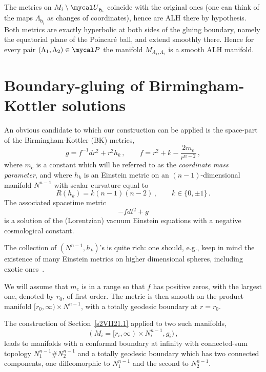 \documentclass[a4paper,10pt]{article}
\newcommand{\horo}{\red{\mathfrak{h}}}
\newcommand{\horoG}{\red{\mycal P}}
\newcommand{\Nk}{\red{N^{n-1}}}
\newcommand{\Nkone}{\red{N^{n-1}_1}}
\newcommand{\Nktwo}{\red{N^{n-1}_2}}
\newcommand{\Nki}{\red{N^{n-1}_i}}
\newcommand{\hk}{\red{h_{k}}}
\newcommand{\red}[1]{{\color{red}#1}}
\newcommand{\mc}{\red{m_{\mathrm c}}}
\newcommand{\mcU}{{\mycal U}}
\renewcommand{\red}[1]{#1}%
\begin{document}
      The metrics on $M_i\setminus \mcU_{\horo_i}$ coincide with the original ones
      (one can think of the maps $\Lambda_{\horo_i}$ as changes of coordinates),
      hence are ALH there by hypothesis. Both metrics are exactly hyperbolic at both
      sides of  the gluing boundary, namely the equatorial plane of the Poincar\'e
      ball, and extend smoothly there. Hence for every pair
      $(\Lambda_1,\Lambda_2)\in \horoG$ the manifold $M_{\Lambda_1,\Lambda_2}$ is a
      smooth ALH manifold.



      \section{Boundary-gluing of Birmingham-Kottler solutions}
      \label{s29VIII21.1}


      An obvious candidate to which our construction can be applied is the space-part of the Birmingham-Kottler (BK) metrics,
      \begin{equation}\label{26XI21.1}
        g = f^{-1} dr^2 + r^2 \hk
        \,,
        \qquad
        f = r^2 + k - \frac{2\mc }{r^{n-2}}
         \,,
      \end{equation}
      where $\mc$ is a constant which will be referred to as the \emph{coordinate mass parameter}, and
      where $\hk $ is an Einstein metric on an $(n-1)$-dimensional manifold $\Nk$
      with scalar curvature equal to
      $$
       R(\hk)= k (n-1)(n-2)
       \,,
       \qquad k \in \{0,\pm1\}
       \,.
      $$
      The associated spacetime
      metric
      $$
       - f dt^2 + g
      $$
      is a solution of the (Lorentzian) vacuum Einstein equations with a negative
      cosmological constant.

      The collection of $(\Nk,\hk)$'s is quite rich:  one should, e.g., keep in mind the existence of many Einstein metrics on higher dimensional spheres, including exotic ones~\cite{BoyerGalickiKollar}.


      We will assume that $\mc$ is in a range so that $f$ has positive zeros, with the largest
      one, denoted by $r_0$, of first order.  The metric is then smooth on the
      product manifold $[r_0,\infty)\times \Nk$, with a totally geodesic boundary
      at $r=r_0$.

      The construction of  Section~\ref{s2VII21.1} applied to  two such manifolds,
      $$
       (M_i= [r_i,\infty)\times \Nki,g_i)
        \,,
      $$
      leads to manifolds with a conformal boundary at infinity with connected-sum topology $\Nkone
      \#\Nktwo $ and a totally geodesic boundary which has two connected
      components, one diffeomorphic to $\Nkone $ and the second to $\Nktwo $.
\end{document}
